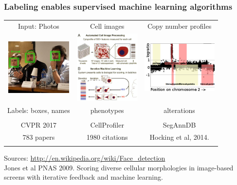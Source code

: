\documentclass{beamer}
\begin{document}
\begin{frame}
  \frametitle{Labeling enables supervised machine learning algorithms}
  \begin{tabular}{ccc}
    Input: Photos & Cell images & Copy number profiles \\
    \includegraphics[width=1.3in]{faces} &
    \includegraphics[width=1.3in]{cellprofiler} &
    \includegraphics[width=1.5in]{regions-axes}\\
    Labels: boxes, names & phenotypes & alterations \\ \\
CVPR 2017
 & CellProfiler & SegAnnDB \\
783 papers
 & 
1980 citations
 & Hocking et al, 2014. \\
     &
  \end{tabular}
  Sources: \url{http://en.wikipedia.org/wiki/Face_detection}\\
  Jones et al PNAS 2009. Scoring diverse cellular morphologies in
  image-based screens with iterative feedback and machine learning.
\end{frame}
\end{document}
